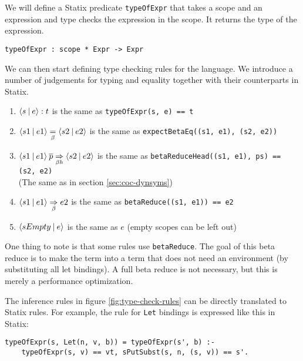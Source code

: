We will define a Statix predicate \verb|typeOfExpr| that takes a scope and an expression and type checks the expression in the scope. It returns the type of the expression.

\begin{lstlisting}
typeOfExpr : scope * Expr -> Expr
\end{lstlisting}
We can then start defining type checking rules for the language. We introduce a number of judgements for typing and equality together with their counterparts in Statix.
\begin{enumerate}
	\item $\langle s \: | \: e\rangle : t$ is the same as \verb|typeOfExpr(s, e) == t|
	\item $\langle s1 \: | \: e1\rangle \underset{\beta}{=} \langle s2 \: | \: e2\rangle$ is the same as \verb|expectBetaEq((s1, e1), (s2, e2))|
	\item $\langle s1 \: | \: e1\rangle \: \overline{p} \underset{\beta h}{\Rightarrow} \langle s2 \: | \: e2\rangle$ is the same as \verb|betaReduceHead((s1, e1), ps) == (s2, e2)| \\ (The same as in section \ref{sec:coc-dynsyms})
	\item $\langle s1 \: | \: e1\rangle \underset{\beta}{\Rightarrow} e2$ is the same as \verb|betaReduce((s1, e1)) == e2|
	\item $\langle sEmpty \: | \: e\rangle$ is the same as $e$ (empty scopes can be left out)
\end{enumerate}

One thing to note is that some rules use \verb|betaReduce|. The goal of this beta reduce is to make the term into a term that does not need an environment (by substituting all let bindings). A full beta reduce is not necessary, but this is merely a performance optimization.

The inference rules in figure \ref{fig:type-check-rules} can be directly translated to Statix rules. For example, the rule for \verb|Let| bindings is expressed like this in Statix:
\begin{lstlisting}
typeOfExpr(s, Let(n, v, b)) = typeOfExpr(s', b) :-
    typeOfExpr(s, v) == vt, sPutSubst(s, n, (s, v)) == s'.
\end{lstlisting}

